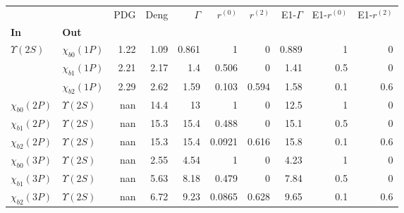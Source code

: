 \begin{tabular}{l|l|r|r|r|r|r|r|r|r}
\toprule
                &                &  PDG &  Deng &  $\Gamma$ &  $r^{(0)}$ &  $r^{(2)}$ &  E1-$\Gamma$ &  E1-$r^{(0)}$ &  E1-$r^{(2)}$ \\
\textbf{In} & \textbf{Out} &      &       &           &            &            &              &               &               \\
\midrule
\textbf{$\Upsilon(2S)$} & \textbf{$\chi_{b0}(1P)$} & 1.22 &  1.09 &     0.861 &          1 &          0 &        0.889 &             1 &             0 \\
                & \textbf{$\chi_{b1}(1P)$} & 2.21 &  2.17 &       1.4 &      0.506 &          0 &         1.41 &           0.5 &             0 \\
                & \textbf{$\chi_{b2}(1P)$} & 2.29 &  2.62 &      1.59 &      0.103 &      0.594 &         1.58 &           0.1 &           0.6 \\
\textbf{$\chi_{b0}(2P)$} & \textbf{$\Upsilon(2S)$} &  nan &  14.4 &        13 &          1 &          0 &         12.5 &             1 &             0 \\
\textbf{$\chi_{b1}(2P)$} & \textbf{$\Upsilon(2S)$} &  nan &  15.3 &      15.4 &      0.488 &          0 &         15.1 &           0.5 &             0 \\
\textbf{$\chi_{b2}(2P)$} & \textbf{$\Upsilon(2S)$} &  nan &  15.3 &      15.4 &     0.0921 &      0.616 &         15.8 &           0.1 &           0.6 \\
\textbf{$\chi_{b0}(3P)$} & \textbf{$\Upsilon(2S)$} &  nan &  2.55 &      4.54 &          1 &          0 &         4.23 &             1 &             0 \\
\textbf{$\chi_{b1}(3P)$} & \textbf{$\Upsilon(2S)$} &  nan &  5.63 &      8.18 &      0.479 &          0 &         7.84 &           0.5 &             0 \\
\textbf{$\chi_{b2}(3P)$} & \textbf{$\Upsilon(2S)$} &  nan &  6.72 &      9.23 &     0.0865 &      0.628 &         9.65 &           0.1 &           0.6 \\
\bottomrule
\end{tabular}

